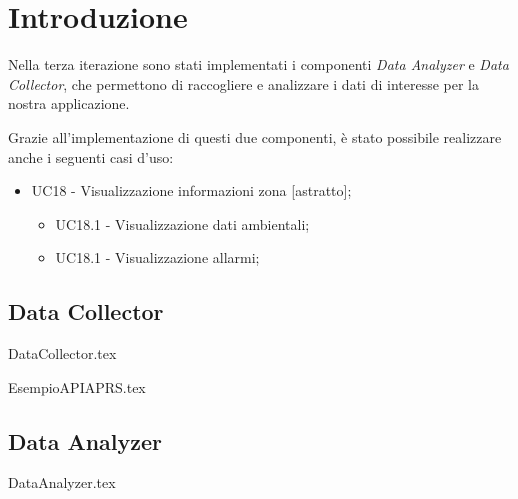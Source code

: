 \section{Introduzione}
Nella terza iterazione sono stati implementati i componenti \textit{Data Analyzer} e \textit{Data Collector}, che permettono di raccogliere e analizzare i dati di interesse per la nostra applicazione. 

Grazie all'implementazione di questi due componenti, è stato possibile realizzare anche i seguenti casi d'uso:
\begin{itemize}
	\item UC18 - Visualizzazione informazioni zona [astratto];
	\begin{itemize}
		\item UC18.1 - Visualizzazione dati ambientali;
		\item UC18.1 - Visualizzazione allarmi;
	\end{itemize}
\end{itemize}


\subsection{Data Collector}
{DataCollector.tex}

\clearpage

{EsempioAPIAPRS.tex}

\clearpage

\subsection{Data Analyzer}
{DataAnalyzer.tex}

\clearpage

